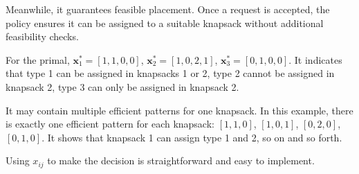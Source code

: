 Meanwhile, it guarantees feasible placement. Once a request is accepted, the policy ensures it can be assigned to a suitable knapsack without additional feasibility checks.

\begin{example}
For the primal, $\bm{x}_{1}^{*} = [1, 1, 0, 0]$, $\bm{x}_{2}^{*} = [1, 0, 2, 1]$, $\bm{x}_{3}^{*} = [0, 1, 0, 0]$. It indicates that type 1 can be assigned in knapsacks 1 or 2, type 2 cannot be assigned in knapsack 2, type 3 can only be assigned in knapsack 2. 

It may contain multiple efficient patterns for one knapsack. In this example, there is exactly one efficient pattern for each knapsack: $[1, 1, 0]$, $[1, 0, 1]$, $[0, 2, 0]$, $[0, 1, 0]$. It shows that knapsack 1 can assign type 1 and 2, so on and so forth.

Using $x_{ij}$ to make the decision is straightforward and easy to implement.
\end{example}


